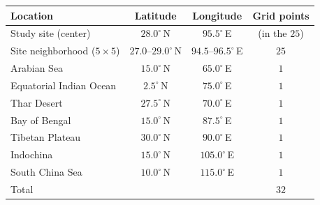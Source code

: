 \begin{tabular}{@{}lccc@{}}
\toprule
Location & Latitude & Longitude & Grid points\\
\midrule
Study site (center) & $28.0^\circ$\,N & $95.5^\circ$\,E & (in the $25$)\\
Site neighborhood ($5\times5$) & $27.0$--$29.0^\circ$\,N & $94.5$--$96.5^\circ$\,E & $25$\\
Arabian Sea & $15.0^\circ$\,N & $65.0^\circ$\,E & $1$\\
Equatorial Indian Ocean & $2.5^\circ$\,N & $75.0^\circ$\,E & $1$\\
Thar Desert & $27.5^\circ$\,N & $70.0^\circ$\,E & $1$\\
Bay of Bengal & $15.0^\circ$\,N & $87.5^\circ$\,E & $1$\\
Tibetan Plateau & $30.0^\circ$\,N & $90.0^\circ$\,E & $1$\\
Indochina & $15.0^\circ$\,N & $105.0^\circ$\,E & $1$\\
South China Sea & $10.0^\circ$\,N & $115.0^\circ$\,E & $1$\\
\midrule
Total & & & $32$\\
\bottomrule
\end{tabular}
